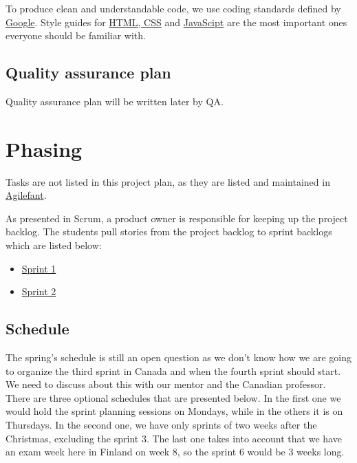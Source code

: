 To produce clean and understandable code, we use coding standards defined by
\href{http://code.google.com/p/google-styleguide/}{Google}. Style guides for
\href{http://google-styleguide.googlecode.com/svn/trunk/htmlcssguide.xml}{HTML,
CSS} and
\href{http://google-styleguide.googlecode.com/svn/trunk/javascriptguide.xml}{JavaScipt} are the most important ones everyone should be familiar with.

\subsection{Quality assurance plan}

Quality assurance plan will be written later by QA.

\section{Phasing}

Tasks are not listed in this project plan, as they are listed and maintained in 
\href{https://cloud.agilefant.com/dev/}{Agilefant}.

As presented in Scrum, a product owner is responsible for keeping up the
project backlog. The students pull stories from the project backlog to sprint
backlogs which are listed below:

\begin{itemize}
  \item
  \href{https://cloud.agilefant.com/dev/ROIteration.action?readonlyToken=656371244996018241588558287820343266020}{Sprint
  1}
  \item
  \href{https://cloud.agilefant.com/dev/ROIteration.action?readonlyToken=807072238002616723743205864538724805102}{Sprint
  2}
\end{itemize}

\subsection{Schedule}

The spring's schedule is still an open question as we don't know how we are
going to organize the third sprint in Canada and when the fourth sprint should
start. We need to discuss about this with our mentor and the Canadian professor.
There are three optional schedules that are presented below. In the first one we
would hold the sprint planning sessions on Mondays, while in the others it is on
Thursdays. In the second one, we have only sprints of two weeks after the
Christmas, excluding the sprint 3. The last one takes into account that we have
an exam week here in Finland on week 8, so the sprint 6 would be 3 weeks long.

